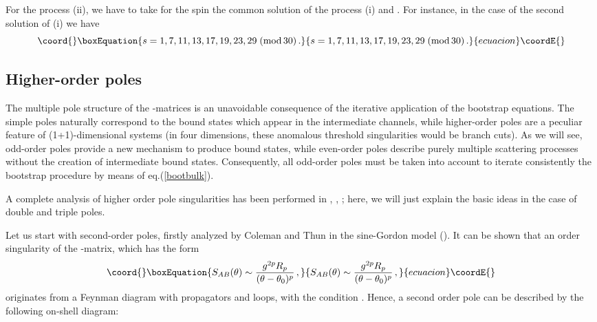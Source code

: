 \documentclass[a4paper,12pt]{report}
\begin{document}
For the process (ii), we have to take for the spin \coordHE{} the common solution of the process (i) and \coordHE{}. For instance, in the case of the second solution of (i) we have
\begin{equation}\coord{}\boxEquation{\label{isingspin}
s=1,7,11,13,17,19,23,29 \;(\textrm{mod}\,30)\,.
}{s=1,7,11,13,17,19,23,29 \;(\textrm{mod}\,30)\,.
}{ecuacion}\coordE{}\end{equation}



\subsection{Higher-order poles}

The multiple pole structure of the \coordHE{}-matrices is an unavoidable consequence of the iterative application of the
bootstrap equations. The simple poles naturally correspond to the bound states which appear in the intermediate
channels, while higher-order poles are a peculiar feature of (1+1)-dimensional systems (in four dimensions, these
anomalous threshold singularities would be branch cuts). As we will see, odd-order poles provide a new mechanism
to produce bound states, while even-order poles describe purely multiple scattering processes without the
creation of intermediate bound states. Consequently, all odd-order poles must be taken into account to iterate
consistently the bootstrap procedure by means of eq.(\ref{bootbulk}).



A complete analysis of higher order pole singularities has been performed in \cite{chrmuss1}, \cite{dur1},
\cite{dur2}; here, we will just explain the basic ideas in the case of double and triple poles.


Let us start with second-order poles, firstly analyzed by Coleman and Thun in the sine-Gordon model
(\cite{colthun}). It can be shown that an order \coordHE{} singularity of the \coordHE{}-matrix, which has the form
\begin{equation}\coord{}\boxEquation{
S_{AB}(\theta)\sim\frac{g^{2p}R_{p}}{(\theta-\theta_{0})^{p}}\,,
}{
S_{AB}(\theta)\sim\frac{g^{2p}R_{p}}{(\theta-\theta_{0})^{p}}\,,
}{ecuacion}\coordE{}\end{equation}
originates from a Feynman diagram with \coordHE{} propagators and \coordHE{} loops, with the condition \coordHE{}. Hence, a
second order pole can be described by the following on-shell diagram:
\end{document}
